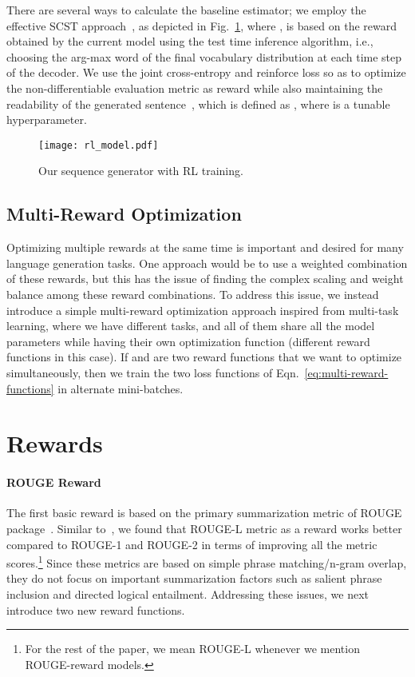 \documentclass[11pt,a4paper]{article}
\begin{document}
There are several ways to calculate the baseline estimator; we employ the effective SCST approach~\cite{rennie2016self}, as depicted in Fig.~\ref{fig:rl-model}, where , is based on the reward obtained by the current model using the test time inference algorithm, i.e., choosing the arg-max word  of the final vocabulary distribution at each time step  of the decoder. We use the joint cross-entropy and reinforce loss so as to optimize the non-differentiable evaluation metric as reward while also maintaining the readability of the generated sentence~\cite{wu2016google,paulus2017deep,pasunuru2017reinforced}, which is defined as , where  is a tunable hyperparameter.
\begin{figure}
\centering
\texttt{[image: rl\_model.pdf]}
\vspace{-10pt}
\caption{Our sequence generator with RL training.\vspace{-5pt}
}
\vspace{-15pt}
\label{fig:rl-model}
\end{figure}
 
\subsection{Multi-Reward Optimization}
\label{subsec:multi-reward-optimization}
Optimizing multiple rewards at the same time is important and desired for many language generation tasks. One approach would be to use a weighted combination of these rewards, but this has the issue of finding the complex scaling and weight balance among these reward combinations. To address this issue, we instead introduce a simple multi-reward optimization approach inspired from multi-task learning, where we have different tasks, and all of them share all the model parameters while having their own optimization function (different reward functions in this case). If  and  are two reward functions that we want to optimize simultaneously, then we train the two loss functions of Eqn.~\ref{eq:multi-reward-functions} in alternate mini-batches.
\vspace{-10pt}


 
\section{Rewards}
\label{sec:rewards}

\paragraph{ROUGE Reward}
The first basic reward is based on the primary summarization metric of ROUGE package~\cite{lin2004rouge}. Similar to~, we found that ROUGE-L metric as a reward works better compared to ROUGE-1 and ROUGE-2 in terms of improving all the metric scores.\footnote{For the rest of the paper, we mean ROUGE-L whenever we mention ROUGE-reward models.} Since these metrics are based on 
simple phrase matching/n-gram overlap, they do not focus on important summarization factors such as salient phrase inclusion and directed logical entailment. Addressing these issues, we next introduce two new reward functions. 
\end{document}
